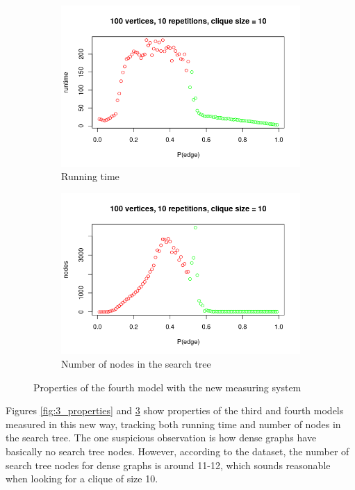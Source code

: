 \documentclass{article}
\theoremstyle{definition}
\begin{document}
\begin{figure}
  \begin{subfigure}{.5\textwidth}
    \includegraphics[scale=0.5]{4_runtime.png}
    \caption{Running time}
    \label{fig:4_runtime}
  \end{subfigure}
  \begin{subfigure}{.5\textwidth}
    \includegraphics[scale=0.5]{4_nodes.png}
    \caption{Number of nodes in the search tree}
    \label{fig:4_nodes}
  \end{subfigure}
  \caption{Properties of the fourth model with the new measuring system}
  \label{fig:4_properties}
\end{figure}
Figures \ref{fig:3_properties} and \ref{fig:4_properties} show properties of the third and fourth models measured in this new way, tracking both running time and number of nodes in the search tree. The one suspicious observation is how dense graphs have basically no search tree nodes. However, according to the dataset, the number of search tree nodes for dense graphs is around 11-12, which sounds reasonable when looking for a clique of size 10.
\end{document}
